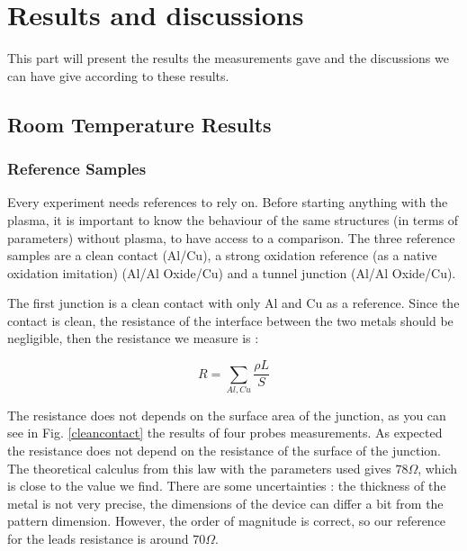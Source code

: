 \pagestyle{fancy}

\chapter{Results and discussions}
\label{Chap4}

This part will present the results the measurements gave and the discussions we can have give according to these results.

\section{Room Temperature Results}
                \subsection{Reference Samples}
                
                Every experiment needs references to rely on. Before starting anything with the plasma, it is important to know the behaviour of the same structures (in terms of parameters) without plasma, to have access to a comparison. The three reference samples are a clean contact (Al/Cu), a strong oxidation reference (as a native oxidation imitation) (Al/Al Oxide/Cu) and a tunnel junction (Al/Al Oxide/Cu).
                
                The first junction is a clean contact with only Al and Cu as a reference. Since the contact is clean, the resistance of the interface between the two metals should be negligible, then the resistance we measure is :
                
                \begin{equation}
                  R=\sum_{Al,Cu}\dfrac{\rho L}{S}  
                  \label{loidohm}
                \end{equation}
                
                The resistance does not depends on the surface area of the junction, as you can see in Fig. \ref{cleancontact} the results of four probes measurements. As expected the resistance does not depend on the resistance of the surface of the junction.
                The theoretical calculus from this law with the parameters used gives $78\Omega$, which is close to the value we find. There are some uncertainties : the thickness of the metal is not very precise, the dimensions of the device can differ a bit from the pattern dimension. However, the order of magnitude is correct, so our reference for the leads resistance is around $70\Omega$.

